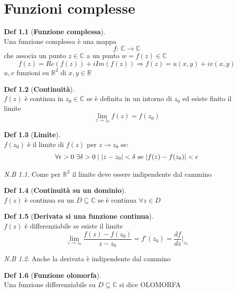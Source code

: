 \documentclass[a4paper,11pt]{report}
\theoremstyle{remark}
\newtheorem*{nb}{N.B}
\theoremstyle{definition}
\newtheorem*{Def}{Def}
\newcommand{\C}{\mathbb{C}}
\newcommand{\R}{\mathbb{R}}
\DeclarePairedDelimiter{\abs}{\lvert}{\rvert}
\begin{document}
\chapter{Funzioni complesse}
\begin{Def}[\textbf{Funzione complessa}] \label{def:f complessa} \hfil\\
	Una funzione complessa è una mappa 
	\[f: \, \C \to \C \]
	che associa un punto $z \in \C$ a un punto $w = f(z) \in \C$
	\[f(z) = Re(f(z)) + iIm(f(z)) \Rightarrow f(z) = u(x,y) + iv(x,y)\]
	$u,v$ funzioni su $\R^2$ di $x,y \in \R$
\end{Def}
\begin{Def}[\textbf{Continuità}] \label{def:continuità} \hfill\\
	$f(z)$ è continua in $z_0 \in \C$ se è definita in un intorno di $z_0$ ed esiste finito il limite 
	\[\lim_{z \to z_0} f(z) = f(z_0)\]
\end{Def}
\begin{Def}[\textbf{Limite}]\label{def:limite}\hfil\\
	$f(z_0)$ è il limite di $f(z)$ per $z \to z_0$ se:
	\[\forall \epsilon>0 \; \exists \delta>0 \; | \; \abs{z-z_0}<\delta \text{ se } \abs{f(z)-f(z_0)}<\epsilon\]
\end{Def}
\begin{nb}
	Come per $\R^2$ il limite deve essere indipendente dal cammino
\end{nb}
\begin{Def}[\textbf{Continuità su un dominio}]\hfil\\
	$f(z)$ è continua su un $D \subseteq \C$ se è continua $\forall z \in D$
\end{Def}
\begin{Def}[\textbf{Derivata si una funzione continua}]\hfil\\
	$f(z)$ è differenziabile se esiste il limite
	\[\lim_{z \to z_0} \frac{f(z)-f(z_0)}{z-z_0} = f'(z_0) = \frac{df}{dz}\Bigr|_{z_0}\]
\end{Def}
\begin{nb}
	Anche la derivata è indipendente dal cammino
\end{nb}
\begin{Def}[\textbf{Funzione olomorfa}]\label{def:olomorfa}\hfil\\
	Una funzione differenziabile su $D \subseteq \C$ si dice OLOMORFA
\end{Def}
\end{document}
